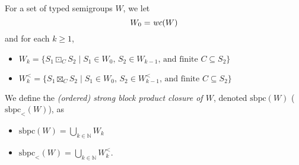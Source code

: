 \documentclass[a4paper,UKenglish,cleveref, autoref, thm-restate, anonymous]{lipics-v2021}
\begin{document}
\begin{definition}
    For a set of typed semigroups $W$, we let \[
        W_0 = \emph{wc}(W)
    \] and for each $k \geq 1$,
    \begin{itemize}
        \item $W_k = \{S_1 \boxdot_C S_2 \mid S_1 \in W_0 \text{, } S_2 \in W_{k-1} \text{, and finite } C \subseteq S_2\}$
        \item $W_k^< = \{S_1 \boxtimes_C S_2 \mid S_1 \in W_0 \text{, } S_2 \in W_{k-1}^< \text{, and finite } C \subseteq S_2\}$
    \end{itemize}
    We define the \emph{(ordered) strong block product closure of $W$}, denoted $\text{sbpc}(W)$ ($\text{sbpc}_<(W)$), as
    \begin{itemize}
        \item $\text{sbpc}(W) = \bigcup_{k \in \mathbb{N}} W_k$
        \item $\text{sbpc}_<(W) = \bigcup_{k \in \mathbb{N}} W_k^<$.
    \end{itemize}
\end{definition}
\end{document}
